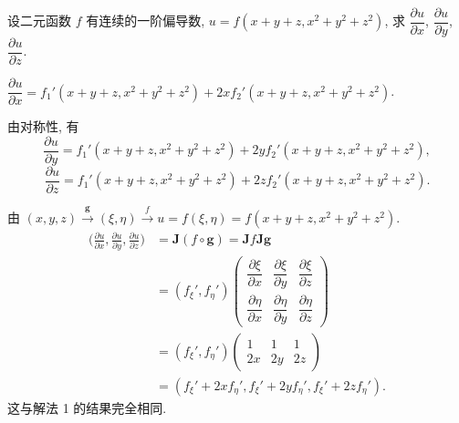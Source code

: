 \begin{example}\label{ex:8.2.7}
设二元函数 $f$ 有连续的一阶偏导数, $u = f(x + y + z, x^{2} + y^{2} + z^{2})$, 求 $\dfrac{\partial u}{\partial x}$, $\dfrac{\partial u}{\partial y}$, $\dfrac{\partial u}{\partial z}$.

\begin{solution}[解法 1]
$\dfrac{\partial u}{\partial x} = f_{1}'(x + y + z, x^{2} + y^{2} + z^{2}) + 2xf_{2}'(x + y + z, x^{2} + y^{2} + z^{2})$.

由对称性, 有
\[
  \frac{\partial u}{\partial y} = f_{1}'(x + y + z, x^{2} + y^{2} + z^{2}) + 2yf_{2}'(x + y + z, x^{2} + y^{2} + z^{2}),
\]
\[
  \frac{\partial u}{\partial z} = f_{1}'(x + y + z, x^{2} + y^{2} + z^{2}) + 2zf_{2}'(x + y + z, x^{2} + y^{2} + z^{2}).
\]
\noqedhere
\end{solution}

\begin{solution}[解法 2]
由 $(x, y, z) \xrightarrow{\boldsymbol{g}} (\xi, \eta) \xrightarrow{f} u = f(\xi, \eta) = f(x + y + z, x^{2} + y^{2} + z^{2})$.
\begin{align*}
  \Big(\frac{\partial u}{\partial x}, \frac{\partial u}{\partial y}, \frac{\partial u}{\partial z}\Big)
  &= \boldsymbol{J}(f \circ \boldsymbol{g}) = \boldsymbol{J}f\boldsymbol{J}\boldsymbol{g} \\
  &= (f_{\xi}', f_{\eta}')\begin{pmatrix}
    \dfrac{\partial\xi}{\partial x} & \dfrac{\partial\xi}{\partial y} & \dfrac{\partial\xi}{\partial z} \\[2mm]
    \dfrac{\partial\eta}{\partial x} & \dfrac{\partial\eta}{\partial y} & \dfrac{\partial\eta}{\partial z}
  \end{pmatrix} \\
  &= (f_{\xi}', f_{\eta}')\begin{pmatrix} 1 & 1 & 1 \\ 2x & 2y & 2z \end{pmatrix} \\
  &= (f_{\xi}' + 2xf_{\eta}', f_{\xi}' + 2yf_{\eta}', f_{\xi}' + 2zf_{\eta}').
\end{align*}
这与解法 1 的结果完全相同. \qedhere
\end{solution}
\end{example}

